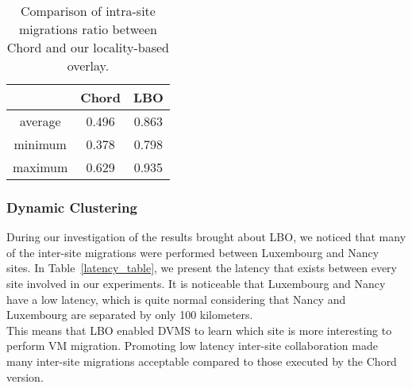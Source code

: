 \begin{table}

  \begin{center}
    \begin{tabular}{|c|c|c|}   

      \hline \multicolumn{1}{|p{3cm}|}{ }
       & \multicolumn{1}{|p{3cm}|}{\centering Chord }  & \multicolumn{1}{|p{3cm}|}{ \centering LBO}  \\

      \hline
      average & 0.496 & 0.863 \\

      \hline
      minimum & 0.378 & 0.798 \\

      \hline
      maximum & 0.629 & 0.935 \\

      \hline
    \end{tabular}
  \end{center}
  \caption{\label{migration_table} Comparison of intra-site migrations ratio
    between Chord and our locality-based overlay.}
\end{table}

\subsubsection{Dynamic Clustering}

During our investigation of the results brought about LBO, we noticed that many of the
inter-site migrations were performed between Luxembourg and Nancy sites. In
Table~\ref{latency_table}, we present the latency that exists between every site involved
in our experiments. It is noticeable that Luxembourg and Nancy have a low latency, which
is quite normal considering that Nancy and Luxembourg are separated by only 100 kilometers.
\\
This means that LBO enabled DVMS to learn which site is more interesting to perform VM
migration. Promoting low latency inter-site collaboration made many inter-site
migrations acceptable compared to those executed by the Chord version.


